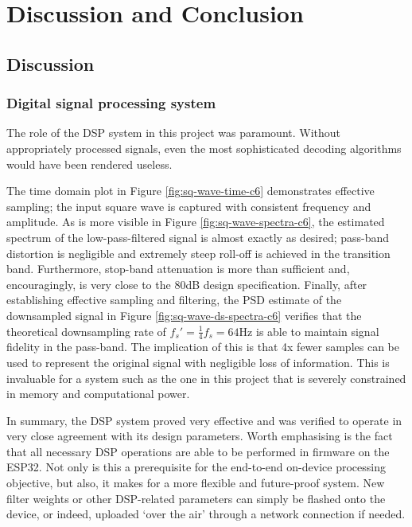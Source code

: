\chapter{Discussion and Conclusion}
\label{chapter:discussion-conclusion}

\graphicspath{ {report/Chapter7/assets/} } 

\section{Discussion}

\subsection{Digital signal processing system}
The role of the DSP system in this project was paramount. Without appropriately processed signals, even the most sophisticated decoding algorithms would have been rendered useless. 

The time domain plot in Figure \ref{fig:sq-wave-time-c6} demonstrates effective sampling; the input square wave is captured with consistent frequency and amplitude. As is more visible in Figure \ref{fig:sq-wave-spectra-c6}, the estimated spectrum of the low-pass-filtered signal is almost exactly as desired; pass-band distortion is negligible and extremely steep roll-off is achieved in the transition band. Furthermore, stop-band attenuation is more than sufficient and, encouragingly, is very close to the 80dB design specification. Finally, after establishing effective sampling and filtering, the PSD estimate of the downsampled signal in Figure \ref{fig:sq-wave-ds-spectra-c6} verifies that the theoretical downsampling rate of $f_s'=\frac{1}{4}f_s = 64$Hz is able to maintain signal fidelity in the pass-band. The implication of this is that 4x fewer samples can be used to represent the original signal with negligible loss of information. This is invaluable for a system such as the one in this project that is severely constrained in memory and computational power.

In summary, the DSP system proved very effective and was verified to operate in very close agreement with its design parameters. Worth emphasising is the fact that all necessary DSP operations are able to be performed in firmware on the ESP32. Not only is this a prerequisite for the end-to-end on-device processing objective, but also, it makes for a more flexible and future-proof system. New filter weights or other DSP-related parameters can simply be flashed onto the device, or indeed, uploaded `over the air' through a network connection if needed.

